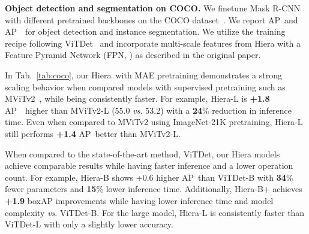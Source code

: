 \documentclass[nohyperref]{article}
\renewcommand{\paragraph}[1]{\vspace{1.25mm}\noindent\textbf{#1}}
\newcommand{\shortname}{{Hiera}}
\theoremstyle{plain}
\theoremstyle{definition}
\theoremstyle{remark}
\newcommand{\boxAP}{AP~}
\newcommand{\maskAP}{AP~}
\begin{document}
\paragraph{Object detection and segmentation on COCO.} We finetune Mask R-CNN~\cite{maskrcnn} with different pretrained backbones on the COCO dataset~\cite{coco}. We report \boxAP and \maskAP~for object detection and instance segmentation. We utilize the training recipe following ViTDet~\cite{vitdet} and incorporate multi-scale features from \shortname{} with a Feature Pyramid Network (FPN, \citet{fpn}) as described in the original paper.

In Tab.~\ref{tab:coco}, our \shortname~with MAE pretraining demonstrates a strong scaling behavior when compared models with supervised pretraining such as MViTv2~\cite{mvitv2}, while being consistently faster. For example, \shortname-L is \textbf{+1.8} \boxAP~higher than MViTv2-L (55.0 \emph{vs.} 53.2) with a \textbf{24}\% reduction in inference time. Even when compared to MViTv2 using ImageNet-21K pretraining, \shortname-L still performs \textbf{+1.4} \boxAP better than MViTv2-L.

When compared to the state-of-the-art method, ViTDet, our \shortname{} models achieve comparable results while having faster inference and a lower operation count. For example, \shortname-B shows +0.6 higher \boxAP than ViTDet-B with \textbf{34}\% fewer parameters and \textbf{15}\% lower inference time. Additionally, \shortname-B+ achieves \textbf{+1.9} boxAP improvements while having lower inference time and model complexity \textit{vs}. ViTDet-B.  For the large model, \shortname-L is consistently faster than ViTDet-L with only a slightly lower accuracy.
\end{document}
